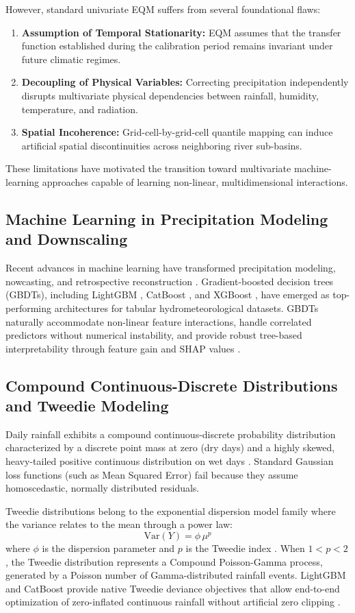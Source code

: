\documentclass[12pt]{article}
\begin{document}
However, standard univariate EQM suffers from several foundational flaws:
\begin{enumerate}
    \item \textbf{Assumption of Temporal Stationarity:} EQM assumes that the transfer function established during the calibration period remains invariant under future climatic regimes.
    \item \textbf{Decoupling of Physical Variables:} Correcting precipitation independently disrupts multivariate physical dependencies between rainfall, humidity, temperature, and radiation.
    \item \textbf{Spatial Incoherence:} Grid-cell-by-grid-cell quantile mapping can induce artificial spatial discontinuities across neighboring river sub-basins.
\end{enumerate}
These limitations have motivated the transition toward multivariate machine-learning approaches capable of learning non-linear, multidimensional interactions.

\subsection{Machine Learning in Precipitation Modeling and Downscaling}
Recent advances in machine learning have transformed precipitation modeling, nowcasting, and retrospective reconstruction \cite{reichstein2019, bano2020}. Gradient-boosted decision trees (GBDTs), including LightGBM \cite{ke2017}, CatBoost \cite{prokhorenkova2018}, and XGBoost \cite{chen2016}, have emerged as top-performing architectures for tabular hydrometeorological datasets. GBDTs naturally accommodate non-linear feature interactions, handle correlated predictors without numerical instability, and provide robust tree-based interpretability through feature gain and SHAP values \cite{lundberg2017}.

\subsection{Compound Continuous-Discrete Distributions and Tweedie Modeling}
Daily rainfall exhibits a compound continuous-discrete probability distribution characterized by a discrete point mass at zero (dry days) and a highly skewed, heavy-tailed positive continuous distribution on wet days \cite{dunn2005}. Standard Gaussian loss functions (such as Mean Squared Error) fail because they assume homoscedastic, normally distributed residuals. 

Tweedie distributions belong to the exponential dispersion model family where the variance relates to the mean through a power law:
\begin{equation}
\text{Var}(Y) = \phi \, \mu^p
\end{equation}
where $\phi$ is the dispersion parameter and $p$ is the Tweedie index \cite{tweedie1984}. When $1 < p < 2$, the Tweedie distribution represents a Compound Poisson-Gamma process, generated by a Poisson number of Gamma-distributed rainfall events. LightGBM and CatBoost provide native Tweedie deviance objectives that allow end-to-end optimization of zero-inflated continuous rainfall without artificial zero clipping \cite{ke2017, prokhorenkova2018}.
\end{document}
